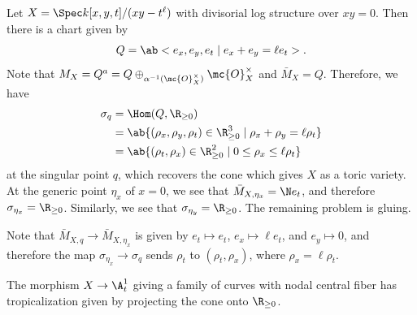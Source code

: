 \begin{exm}
    Let \(X = \Spec k[x,y,t]/(xy-t^{\ell})\) with divisorial log structure over \(xy = 0\). Then there is a chart given by
    \[ Q = \ab<e_x, e_y, e_t \mid e_x + e_y = \ell e_t>. \]
    Note that \(M_X = Q^a = Q \oplus_{\alpha^{-1}(\mc{O}_X^{\times})} \mc{O}_X^{\times}\) and \(\bar{M}_X = Q\). Therefore, we have
    \begin{align*}
        \sigma_q &= \Hom(Q, \R_{\geq 0}) \\
        &= \ab\{ (\rho_x, \rho_y, \rho_t) \in \R_{\geq 0}^3 \mid \rho_x + \rho_y = \ell \rho_t \} \\
        &= \ab\{ (\rho_t, \rho_x) \in \R_{\geq 0}^2 \mid 0 \leq \rho_x \leq \ell \rho_t \}
    \end{align*}
    at the singular point \(q\), which recovers the cone which gives \(X\) as a toric variety. At the generic point \(\eta_x\) of \(x = 0\), we see that \(\bar{M}_{X, \eta_x} = \N e_t\), and therefore \(\sigma_{\eta_x} = \R_{\geq 0}\). Similarly, we see that \(\sigma_{\eta_y} = \R_{\geq 0}\). The remaining problem is gluing. 

    Note that \(\bar{M}_{X, q} \to \bar{M}_{X, \eta_x}\) is given by \(e_t \mapsto e_t\), \(e_x \mapsto \ell e_t\), and \(e_y \mapsto 0\), and therefore the map \(\sigma_{\eta_x} \to \sigma_q\) sends \(\rho_t\) to \((\rho_t, \rho_x)\), where \(\rho_x = \ell \rho_t\).

    The morphism \(X \to \A^1_t\) giving a family of curves with nodal central fiber has tropicalization given by projecting the cone onto \(\R_{\geq 0}\).
\end{exm}


